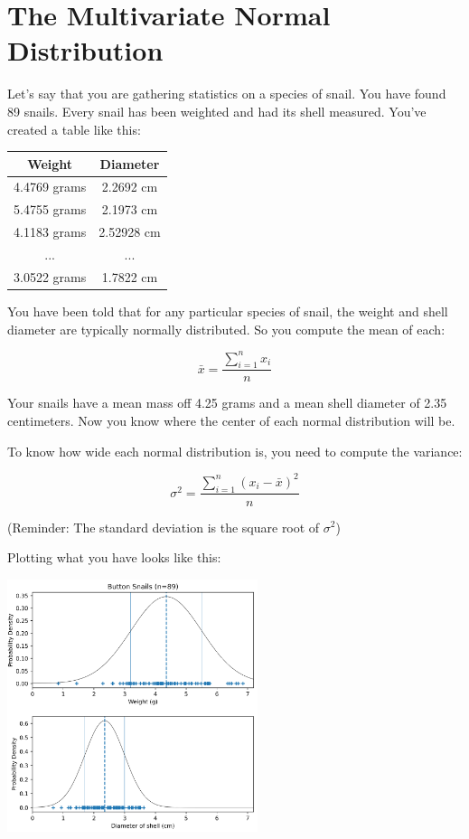 \chapter{The Multivariate Normal Distribution}

Let's say that you are gathering statistics on a species of snail. You have found 89 snails.
Every snail has been weighted and had its shell measured. You've created a table like this:

\begin{tabular}{ c c }
Weight & Diameter \\
\hline
4.4769 grams & 2.2692 cm\\
5.4755 grams & 2.1973 cm\\
4.1183 grams & 2.52928 cm\\
... & ... \\
3.0522 grams & 1.7822 cm
\end{tabular}


You have been told that for any particular species of snail, the weight and shell diameter are typically normally distributed.
So you compute the mean of each:

$$\bar{x} = \frac{\sum_{i=1}^{n} x_i}{n}$$

Your snails have a mean mass off 4.25 grams and a mean shell diameter of 2.35 centimeters.
Now you know where the center of each normal distribution will be.

To know how wide each normal distribution is, you need to compute the variance:

$$\sigma^2 = \frac{\sum_{i=1}^{n} (x_i - \bar{x})^2}{n}$$

(Reminder: The standard deviation is the square root of $\sigma^2$)

Plotting what you have looks like this:

\includegraphics[width=0.55\textwidth]{separate.png}

